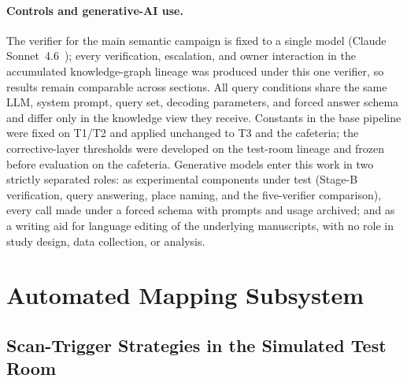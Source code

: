 \paragraph{Controls and generative-AI use.}
The verifier for the main semantic campaign is fixed to a single model
(Claude Sonnet~4.6~\cite{anthropic2026}); every verification, escalation, and
owner interaction in the accumulated knowledge-graph lineage was produced under
this one verifier, so results remain comparable across sections. All query
conditions share the same LLM, system prompt, query set, decoding parameters,
and forced answer schema and differ only in the knowledge view they receive.
Constants in the base pipeline were fixed on T1/T2 and applied unchanged to T3
and the cafeteria; the corrective-layer thresholds were developed on the
test-room lineage and frozen before evaluation on the cafeteria. Generative
models enter this work in two strictly separated roles: as experimental
components under test (Stage-B verification, query answering, place naming,
and the five-verifier comparison), every call made under a forced schema with
prompts and usage archived; and as a writing aid for language editing of the
underlying manuscripts, with no role in study design, data collection, or
analysis.

\section{Automated Mapping Subsystem}
\label{sec:exp-mapping}

\subsection{Scan-Trigger Strategies in the Simulated Test Room}
\label{subsec:prelim-mapping}

